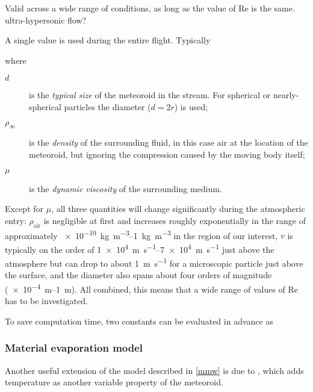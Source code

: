         Valid across a wide range of conditions, as long as the value of Re is the same.
        ultra-hypersonic flow?

        A single value is used during the entire flight. Typically


        where
        \begin{description}
            \item[$d$] is the \emph{typical size} of the meteoroid in the stream.
                For spherical or nearly-spherical particles the diameter ($d = 2r$) is used;
            \item[$\rho_\infty$] is the \emph{density} of the surrounding fluid, in this case
                air at the location of the meteoroid, but ignoring the compression caused
                by the moving body itself;
            \item[$\mu$] is the \emph{dynamic viscosity} of the surrounding medium.
        \end{description}

        Except for $\mu$, all three quantities will change significantly
        during the atmospheric entry: $\rho_\mathrm{air}$ is negligible at first
        and increases roughly exponentially in the range of approximately \SIrange{e-10}{1}{\kilo\gram\per\metre\cubed}
        in the region of our interest, $v$ is typically on the order of \SIrange{1e4}{7e4}{\metre\per\second}
        just above the atmosphere but can drop to about \SI{1}{\metre\per\second}
        for a microscopic particle just above the surface, and the diameter also spans
        about four orders of magnitude (\SIrange{e-4}{1}{\metre}).
        All combined, this means that a wide range of values of $\mathrm{Re}$ has to be investigated.


        To save computation time, two constants can be evaluated in advance as


    \subsubsection{Material evaporation model} \label{mwh}
        Another useful extension of the model described in \cref{mmw} is due to
        \cite{hill+2005}, which adds temperature as another variable property of the meteoroid.


